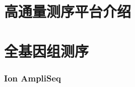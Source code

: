 \documentclass[11pt,a4paper,oneside]{ctexbook}
\begin{document}
	\tableofcontents

\part{高通量测序平台介绍}
	
	
	
	
	
	
\part{全基因组测序}	
	
	
	
	\section{Ion AmpliSeq\texttrademark}
	
	
	
	
\end{document}
